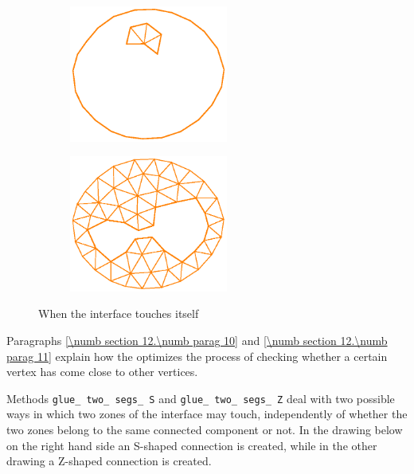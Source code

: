 \begin{figure}[ht] \centering
\begin{subfigure}{65mm}\centering
  \includegraphics[width=52mm]{touching-interf-1}
\end{subfigure}  
\begin{subfigure}{65mm}\centering
  \includegraphics[width=52mm]{touching-interf-2}
\end{subfigure}  
  \caption{When the interface touches itself}
  \label{\numb section 12.\numb fig 6}
\end{figure}

Paragraphs \ref{\numb section 12.\numb parag 10} and \ref{\numb section 12.\numb parag 11}
explain how the {\small\tt{}} optimizes the process of checking whether a
certain vertex has come close to other vertices.

Methods {\small\tt glue\_\,two\_\,segs\_\,S} and
{\small\tt glue\_\,two\_\,segs\_\,Z} deal with two possible ways in which two
zones of the interface may touch,
independently of whether the two zones belong to the same connected component or not.
In the drawing below on the right hand side an S-shaped connection is created,
while in the other drawing a Z-shaped connection is created.

